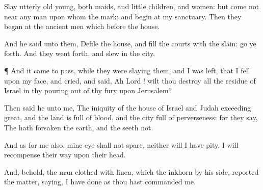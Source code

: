 {Slay
utterly
old
{}
young, both
maids, and little
children, and
women: but come not
near any
man upon whom
{} the
mark; and
begin at my
sanctuary. Then they
began at the
ancient
men which
{}
before the
house.

And he
said unto them,
Defile the
house, and
fill the
courts with the
slain: go ye
forth. And they went
forth, and
slew in the
city.


\par }{\PP {}¶ And it came to pass, while they were
slaying them, and I was
left, that I
fell upon my
face, and
cried, and
said,
Ah
Lord
{}! wilt thou
destroy all the
residue of
Israel in thy pouring
out of thy
fury upon
Jerusalem?

Then
said he unto me, The
iniquity of the
house of
Israel and
Judah
{}
exceeding
great, and the
land is
full of
blood, and the
city
full of
perverseness: for they
say, The
{} hath
forsaken the
earth, and the
{}
seeth not.

And as for me also, mine
eye shall not
spare, neither will I have
pity,
{} I will
recompense their
way upon their
head.

And, behold, the
man
clothed with
linen, which
{} the
inkhorn by his
side,
reported the
matter,
saying, I have
done as thou hast
commanded me.




\par }
